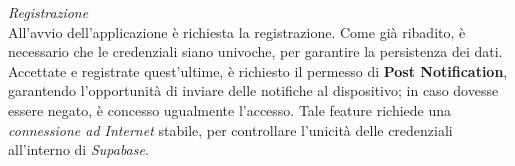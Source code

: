 \documentclass{article}
\begin{document}
    \textit{Registrazione} \vspace*{7pt}\\
    All'avvio dell'applicazione è richiesta la registrazione. Come già ribadito, è necessario che le credenziali siano univoche, per garantire la persistenza dei dati.
    Accettate e registrate quest'ultime, è richiesto il permesso di \textbf{Post Notification}, garantendo l'opportunità di inviare delle notifiche al dispositivo; in caso dovesse essere negato, è concesso ugualmente l'accesso. Tale feature richiede una \textit{connessione ad Internet} stabile, per controllare l'unicità delle credenziali
    all'interno di \textit{Supabase}.
    \begin{center}
        \begin{figure}[H]
            \centering
        \end{figure}
    \end{center}
\end{document}

